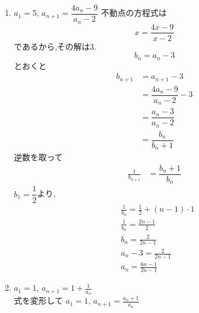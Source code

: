 \begin{enumerate}[label=(\arabic*),parsep=3pt]
\[            \]
            なので,
            \[
              b_n=\frac{a_n-2}{a_n+2}
            \]
            と置くと,
            \begin{align*}
              &b_{n+1}=-\frac13 b_n,\quad b_1=\frac{a_1-2}{a_1+2}=\frac{-2}{2}=-1\\
              &\therefore \quad b_n=(-1)\left(-\frac13\right)^{n-1}=\frac{(-1)^n}{3^{n-1}}
            \end{align*}
            \[
              b_n=\frac{a_n-2}{a_n+2}
            \]
            を$a_n$について解くと,
            \[
              a_n=\frac{2(1+b_n)}{1-b_n}
            \]
            となるので,
            \[
              b_n=\frac{(-1)^n}{3^{n-1}}
            \]
            を代入し,分母分子に$3^{n-1}$を掛けて整理すると,
            \[
              a_n=\frac{2\left(3^{n-1}+(-1)^n\right)}{3^{n-1}-(-1)^n}
            \]
            を得る.
      \item $\displaystyle a_1=5,\, a_{n+1}=\dfrac{4a_{n}-9}{a_{n}-2}$
            不動点の方程式は
            \[
              x=\frac{4x-9}{x-2}
            \]
            であるから,その解は3.
            \[
            b_n=a_n-3
            \]
            とおくと
            \begin{align*}
              b_{n+1}&=a_{n+1}-3\\
              &=\dfrac{4a_{n}-9}{a_{n}-2}-3\\
              &=\dfrac{a_{n}-3}{a_{n}-2}\\
              &=\dfrac{b_{n}}{b_{n}+1}
            \end{align*}
            逆数を取って
            \begin{align*}
              \frac{1}{b_{n+1}}&=\dfrac{b_{n}+1}{b_{n}}
            \end{align*}
            $b_1=\dfrac{1}{2}$より,
            \begin{align*}
              &\frac{1}{b_n}=\frac{1}{2}+(n-1)\cdot 1\\
              &\frac{1}{b_n}=\frac{2n-1}{2}\\
              &b_n=\frac{2}{2n-1}\\
              &a_n-3=\frac{2}{2n-1}\\
              &a_n=\frac{6n-1}{2n-1}
            \end{align*}
      \item $\displaystyle a_1=1,\, a_{n+1}=1+\frac{1}{a_n}$\\
            式を変形して
            $\displaystyle a_1=1,\, a_{n+1}=\frac{a_n+1}{a_n}$

\end{enumerate}
